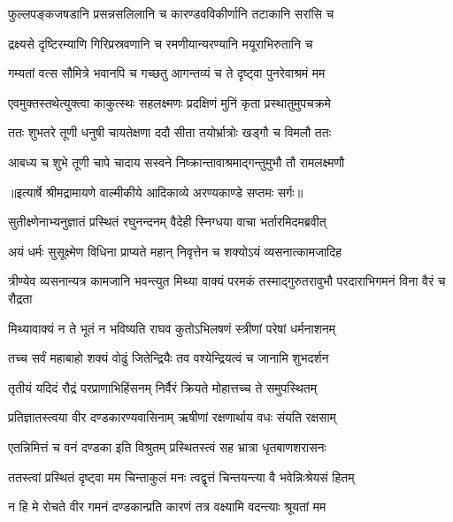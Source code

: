 \twolineshloka
{फुल्लपङ्कजषडानि प्रसन्नसलिलानि च}
{कारण्डवविकीर्णानि तटाकानि सरांसि च} %

\twolineshloka
{द्रक्ष्यसे दृष्टिरम्याणि गिरिप्रस्रवणानि च}
{रमणीयान्यरण्यानि मयूराभिरुतानि च} %

\twolineshloka
{गम्यतां वत्स सौमित्रे भवानपि च गच्छतु}
{आगन्तव्यं च ते दृष्ट्वा पुनरेवाश्रमं मम} %

\twolineshloka
{एवमुक्तस्तथेत्युक्त्वा काकुत्स्थः सहलक्ष्मणः}
{प्रदक्षिणं मुनिं कृता प्रस्थातुमुपचक्रमे} %

\twolineshloka
{ततः शुभतरे तूणी धनुषी चायतेक्षणा}
{ददौ सीता तयोर्भ्रात्रोः खड्गौ च विमलौ ततः} %

\twolineshloka
{आबध्य च शुभे तूणी चापे चादाय सस्वने}
{निष्क्रान्तावाश्रमाद्गन्तुमुभौ तौ रामलक्ष्मणौ} %


{॥इत्यार्षे श्रीमद्रामायणे वाल्मीकीये आदिकाव्ये अरण्यकाण्डे सप्तमः सर्गः॥}


\twolineshloka
{सुतीक्ष्णेनाभ्यनुज्ञातं प्रस्थितं रघुनन्दनम्}
{वैदेही स्निग्धया वाचा भर्तारमिदमब्रवीत्} %

\twolineshloka
{अयं धर्मः सुसूक्ष्मेण विधिना प्राप्यते महान्}
{निवृत्तेन च शक्योऽयं व्यसनात्कामजादिह} %

\threelineshloka
{त्रीण्येव व्यसनान्यत्र कामजानि भवन्त्युत}
{मिथ्या वाक्यं परमकं तस्माद्गुरुतरावुभौ}
{परदाराभिगमनं विना वैरं च रौद्रता} %

\twolineshloka
{मिथ्यावाक्यं न ते भूतं न भविष्यति राघव}
{कुतोऽभिलषणं स्त्रीणां परेषां धर्मनाशनम्} %

\twolineshloka
{तच्च सर्वं महाबाहो शक्यं वोढुं जितेन्द्रियैः}
{तव वश्येन्द्रियत्वं च जानामि शुभदर्शन} %

\twolineshloka
{तृतीयं यदिदं रौद्रं परप्राणाभिहिंसनम्}
{निर्वैरं क्रियते मोहात्तच्च ते समुपस्थितम्} %

\twolineshloka
{प्रतिज्ञातस्त्वया वीर दण्डकारण्यवासिनाम्}
{ऋषीणां रक्षणार्थाय वधः संयति रक्षसाम्} %

\twolineshloka
{एतन्निमित्तं च वनं दण्डका इति विश्रुतम्}
{प्रस्थितस्त्वं सह भ्रात्रा धृतबाणशरासनः} %

\twolineshloka
{ततस्त्वां प्रस्थितं दृष्ट्वा मम चिन्ताकुलं मनः}
{त्वद्वृत्तं चिन्तयन्त्या वै भवेन्निःश्रेयसं हितम्} %

\twolineshloka
{न हि मे रोचते वीर गमनं दण्डकान्प्रति}
{कारणं तत्र वक्ष्यामि वदन्त्याः श्रूयतां मम} %

